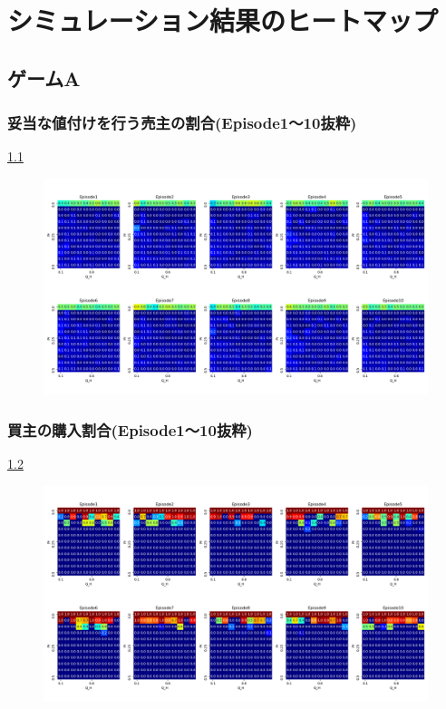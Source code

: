 \documentclass[a4paper,fontsize=11pt,report,notitlepage,line_length=38zw,number_of_lines=40,dvipdfmx]{jlreq}
\begin{document}
\chapter{シミュレーション結果のヒートマップ}
\section{ゲームA}
\begin{landscape}
\subsection{妥当な値付けを行う売主の割合(Episode1〜10抜粋)}
\ref{Honest_Seller_gameA}
\begin{figure}
 \centering
 \includegraphics[width=18cm]{Honest_Seller_gameA.png}
 \caption{}
 \label{Honest_Seller_gameA}
\end{figure}
\end{landscape}
\newpage
\begin{landscape}
\subsection{買主の購入割合(Episode1〜10抜粋)}
\ref{Trading_gameA}
\begin{figure}
 \centering
 \includegraphics[width=18cm]{Trading_gameA.png}
 \caption{}
 \label{Trading_gameA}
\end{figure}
\end{landscape}
\newpage
\end{document}
